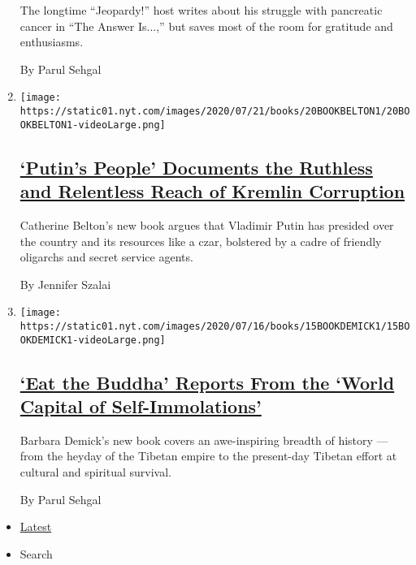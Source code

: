 \begin{enumerate}
  The longtime ``Jeopardy!'' host writes about his struggle with
  pancreatic cancer in ``The Answer Is...,'' but saves most of the room
  for gratitude and enthusiasms.

  By Parul Sehgal
\item
  \texttt{[image: https://static01.nyt.com/images/2020/07/21/books/20BOOKBELTON1/20BOOKBELTON1-videoLarge.png]}

  \hypertarget{putins-people-documents-the-ruthless-and-relentless-reach-of-kremlin-corruption}{%
  \subsection{\texorpdfstring{\href{/2020/07/16/books/review-putins-people-kgb-catherine-belton.html}{`Putin's
  People' Documents the Ruthless and Relentless Reach of Kremlin
  Corruption}}{`Putin's People' Documents the Ruthless and Relentless Reach of Kremlin Corruption}}\label{putins-people-documents-the-ruthless-and-relentless-reach-of-kremlin-corruption}}

  Catherine Belton's new book argues that Vladimir Putin has presided
  over the country and its resources like a czar, bolstered by a cadre
  of friendly oligarchs and secret service agents.

  By Jennifer Szalai
\item
  \texttt{[image: https://static01.nyt.com/images/2020/07/16/books/15BOOKDEMICK1/15BOOKDEMICK1-videoLarge.png]}

  \hypertarget{eat-the-buddha-reports-from-the-world-capital-of-self-immolations}{%
  \subsection{\texorpdfstring{\href{/2020/07/15/books/eat-buddha-life-death-tibetan-town-barbara-demick.html}{`Eat
  the Buddha' Reports From the `World Capital of
  Self-Immolations'}}{`Eat the Buddha' Reports From the `World Capital of Self-Immolations'}}\label{eat-the-buddha-reports-from-the-world-capital-of-self-immolations}}

  Barbara Demick's new book covers an awe-inspiring breadth of history
  --- from the heyday of the Tibetan empire to the present-day Tibetan
  effort at cultural and spiritual survival.

  By Parul Sehgal
\end{enumerate}

\begin{itemize}
\tightlist
\item
  \protect\hyperlink{stream-panel}{Latest}
\item
  Search
\end{itemize}

